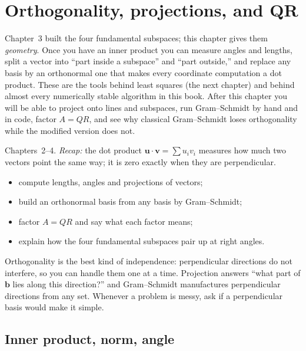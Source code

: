 \chapter{Orthogonality, projections, and QR}\label{ch:orthogonality}

Chapter~3 built the four fundamental subspaces; this chapter gives them
\emph{geometry}. Once you have an inner product you can measure angles and
lengths, split a vector into ``part inside a subspace'' and ``part outside,''
and replace any basis by an orthonormal one that makes every coordinate
computation a dot product. These are the tools behind least squares (the
next chapter) and behind almost every numerically stable algorithm in this
book. After this chapter you will be able to project onto lines and
subspaces, run Gram--Schmidt by hand and in code, factor $A=QR$, and see
why classical Gram--Schmidt loses orthogonality while the modified version
does not.

\begin{rulebox}
Chapters~2--4. \emph{Recap:} the dot product $\mathbf u\cdot\mathbf v=\sum u_iv_i$ measures how much two vectors point the same way; it is zero exactly when they are perpendicular.
\end{rulebox}
\begin{wins}
\begin{itemize}
\item compute lengths, angles and projections of vectors;
\item build an orthonormal basis from any basis by Gram--Schmidt;
\item factor $A=QR$ and say what each factor means;
\item explain how the four fundamental subspaces pair up at right angles.
\end{itemize}
\end{wins}
\begin{principle}
Orthogonality is the best kind of independence: perpendicular directions do not interfere, so you can handle them one at a time. Projection answers ``what part of $\mathbf b$ lies along this direction?'' and Gram--Schmidt manufactures perpendicular directions from any set. Whenever a problem is messy, ask if a perpendicular basis would make it simple.
\end{principle}

\section{Inner product, norm, angle}\label{sec:orth-inner}

